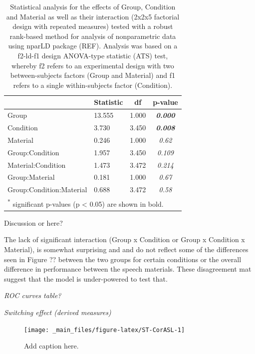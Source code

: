 \documentclass[a4paper, twoside]{templates/ociamthesis}
\begin{document}
\begin{table}

\caption{\label{tab:ST-Tab-nparLD}Statistical analysis for the effects of Group, Condition and Material as well as their interaction (2x2x5 factorial design with repeated measures) tested with a robust rank-based method for analysis of nonparametric data using nparLD package (REF). Analysis was based on a f2-ld-f1 design ANOVA-type statistic (ATS) test, whereby f2 refers to an experimental design with two between-subjects factors (Group and Material) and f1 refers to a single within-subjects factor (Condition).}
\centering
\begin{tabular}[t]{llc>{}c}
\toprule
  & Statistic & df & p-value\\
\midrule
Group & 13.555 & 1.000 & \em{\textbf{0.000}}\\
Condition & 3.730 & 3.450 & \em{\textbf{0.008}}\\
Material & 0.246 & 1.000 & \em{0.62}\\
Group:Condition & 1.957 & 3.450 & \em{0.109}\\
Material:Condition & 1.473 & 3.472 & \em{0.214}\\
\addlinespace
Group:Material & 0.181 & 1.000 & \em{0.67}\\
Group:Condition:Material & 0.688 & 3.472 & \em{0.58}\\
\bottomrule
\multicolumn{4}{l}{\textsuperscript{*} significant p-values (p < 0.05) are shown in bold.}\\
\end{tabular}
\end{table}

\colorbox[HTML]{CCCCFF}{Discussion or here?}

The lack of significant interaction (Group x Condition or Group x Condition x Material), is somewhat surprising and and do not reflect some of the differences seen in Figure ?? between the two groups for certain conditions or the overall difference in performance between the speech materials. These disagreement mat suggest that the model is under-powered to test that.

\colorbox[HTML]{CCCCFF}{\emph{ROC curves table?}}

\colorbox[HTML]{CCCCFF}{\emph{Switching effect (derived measures)}}

\begin{figure}

{\centering \texttt{[image: \_main\_files/figure-latex/ST-CorASL-1]} 

}

\caption{Add caption here.}\label{fig:ST-CorASL}
\end{figure}
\end{document}
